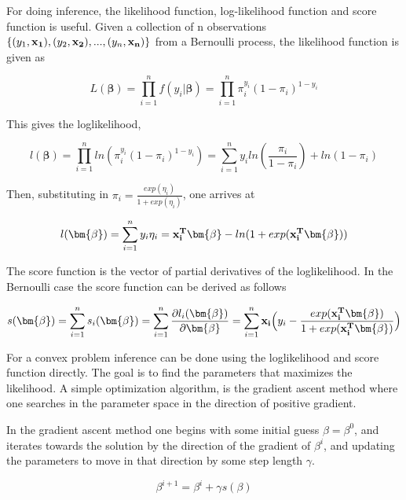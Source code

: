 For doing inference, the likelihood function, log-likelihood function and score function is useful. Given a collection of n observations $\{(y_1, {\bf x_1}), (y_2, {\bf x_2}),...,(y_n, {\bf x_n})\}$ from a Bernoulli process, the likelihood function is given as

\begin{equation}
    L(\bm{\beta}) = \prod_{i=1}^{n} f(y_i |\bm{ \beta}) = \prod_{i=1}^{n} \pi_i^{y_i}(1-\pi_i)^{1-y_i}
\end{equation}

This gives the loglikelihood,

\begin{equation}
    l(\bm{\beta}) = \prod_{i=1}^{n} ln(\pi_i^{y_i}(1-\pi_i)^{1-y_i})  = \sum_{i=1}^{n} y_i ln(\frac{\pi_i}{1-\pi_i}) + ln(1-\pi_i)
\end{equation}

Then, substituting in $\pi_i = \frac{exp(\eta_i)}{1+exp(\eta_i)}$, one arrives at

\begin{equation}
    l(\bm{\beta}) = \sum_{i=1}^{n} y_i \eta_i = {\bf x_i^T} \bm{ \beta} - ln(1 + exp(\bf x_i^T \bm{ \beta}))
\end{equation}

The score function is the vector of partial derivatives of the loglikelihood. In the Bernoulli case the score function can be derived as follows

\begin{equation}
s(\bm{\beta}) = \sum_{i=1}^{n}s_i(\bm{\beta}) = \sum_{i=1}^{n} \frac{\partial l_i(\bm{\beta})}{\partial \bm{\beta}} = \sum_{i=1}^{n} {\bf x_i} \Big ( y_i - \frac{exp({\bf x_i^T} \bm{ \beta})}{1 + exp({\bf x_i^T} \bm{ \beta})}\Big )
\end{equation}

For a convex problem inference can be done using the loglikelihood and score function directly. The goal is to find the parameters that maximizes the likelihood. A simple optimization algorithm, is the gradient ascent method where one searches in the parameter space in the direction of positive gradient. 

In the gradient ascent method one begins with some initial guess $\beta = \beta^0$, and iterates towards the solution by the direction of the gradient of $\beta^i$, and updating the parameters to move in that direction by some step length $\gamma$.

\begin{equation}
    \beta^{i+1} = \beta^{i} + \gamma s(\beta)
\end{equation}

